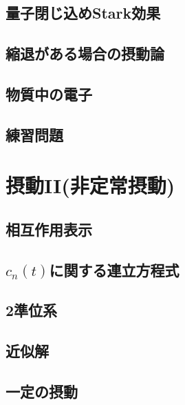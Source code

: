 \documentclass{report}
\begin{document}
      \subsection{量子閉じ込めStark効果}
        
      \subsection{縮退がある場合の摂動論}
        
      \subsection{物質中の電子}
        
      \subsection{練習問題}
        
    \section{摂動II(非定常摂動)}
      
      \subsection{相互作用表示}
        
      \subsection{$c_n(t)$に関する連立方程式}
        
      \subsection{2準位系}
        
      \subsection{近似解}
        
      \subsection{一定の摂動}
        
\end{document}
